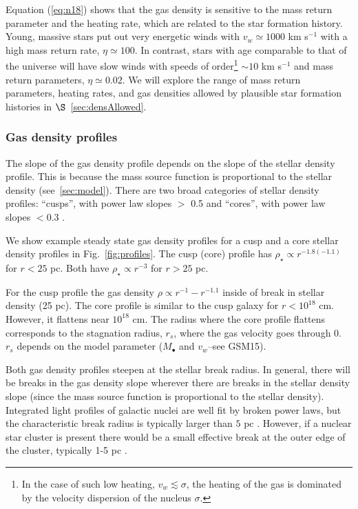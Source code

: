 \documentclass[usenatbib,fleqn]{mnras}
\newcommand{\Mbh}[1][]{M_{\bullet#1}}
\begin{document}
Equation (\ref{eq:n18}) shows that the gas density is sensitive to the
mass return parameter and the heating rate, which are related to the
star formation history. Young, massive stars put out very energetic
winds with $v_w\simeq 1000$ km s$^{-1}$ with a high mass return rate,
$\eta\simeq 100$.  In contrast, stars with age comparable to that of
the universe will have slow winds with speeds of order\footnote{In the
  case of such low heating, $v_w \lesssim \sigma$, the heating of the
  gas is dominated by the velocity dispersion of the nucleus
  $\sigma$.} $\sim 10$ km s$^{-1}$ and mass return parameters,
$\eta\simeq0.02$. We will explore the range of mass
return parameters, heating rates, and gas densities allowed by
plausible star formation histories in $\S$~\ref{sec:densAllowed}.

\subsubsection{Gas density profiles}
The slope of the gas density profile depends on the slope of the
stellar density profile.  This is because the  mass source function is
proportional to the stellar density (see~\ref{sec:model}). There are
two broad categories of stellar density profiles: ``cusps'', with power
law slopes $>$ 0.5  and ``cores'', with power law slopes $<0.3$ \citep{Lauer+2007}.

We show example steady state gas density profiles for a cusp and a
core stellar density profiles in Fig.~\ref{fig:profiles}. The cusp
(core) profile has $\rho_\star \propto r^{-1.8 (-1.1)}$ for $r < 25$
pc. Both have $\rho_\star \propto r^{-3}$ for $r > 25$ pc.

For the cusp profile the gas density $\rho \propto r^{-1}-r^{-1.1}$
inside of break in stellar density (25 pc).  The core profile
is similar to the cusp galaxy for $r<10^{18}$ cm. However, it flattens near
$10^{18}$ cm.  The radius where the core profile flattens corresponds
to the stagnation radius, $r_s$, where the gas velocity goes through
0.  $r_s$ depends on the model parameter ($\Mbh$ and $v_w$--see
GSM15).

Both gas density profiles steepen at the stellar break
radius. In general, there will be breaks in the gas density slope
wherever there are breaks in the stellar density slope (since the mass
source function is proportional to the stellar density).  Integrated
light profiles of galactic nuclei are well fit by broken power laws,
but the characteristic break radius is typically larger than $5 $ pc
\citep{Lauer+2007}. However, if a nuclear star cluster is present
there would be a small effective break at the outer edge of the
cluster, typically 1-5 pc \citep{Georgiev+2014}.
\end{document}
